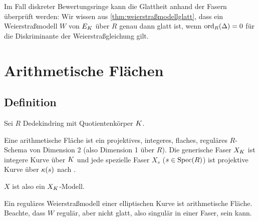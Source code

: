 \documentclass[german]{scrreprt}
\begin{document}
\begin{Bemerkung}
  Im Fall diskreter Bewertungsringe kann die Glattheit anhand der Fasern
  überprüft werden:
  Wir wissen aus \ref{thm:weierstraßmodellglatt},
  dass ein Weierstraßmodell $W$ von $E_{K}$ über $R$ genau dann glatt
  ist, wenn $\operatorname{ord}_R(\Delta)=0$ für die Diskriminante der
  Weierstraßgleichung gilt.
\end{Bemerkung}



\chapter{Arithmetische Flächen}
\section{Definition}
\begin{Definition}
  Sei $R$ Dedekindring mit Quotientenkörper $K$.

  
  Eine arithmetische Fläche ist ein projektives, integeres, flaches,
  reguläres $R$-Schema von Dimension 2 (also Dimension 1 über $R$).
  Die generische Faser $X_{K}$ ist integere Kurve über $K$ und jede
  spezielle Faser $X_s$ ($s\in\operatorname{Spec}(R)$) ist projektive Kurve über
  $\kappa(s)$ nach \cite[Lemma 8.3.3]{liu}.
  
  $X$ ist also ein $X_{K}$-Modell.
\end{Definition}

\begin{Beispiel}
  Ein reguläres Weierstraßmodell einer elliptischen Kurve ist
  arithmetische Fläche.
  Beachte, dass $W$ regulär, aber nicht glatt, also singulär in einer
  Faser, sein kann.
\end{Beispiel}
\end{document}

